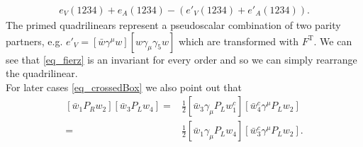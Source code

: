\begin{align}
 e_V(1234)+e_A(1234)-\left(e'_V(1234) + e'_A(1234)\right).
 \label{eq_fierz}
\end{align}
The primed quadrilinears represent a pseudoscalar combination of two parity partners, e.g. $e'_V = \left[\bar w\gamma^\mu w\right]\left[w\gamma_\mu\gamma_5w\right]$
which are transformed with $F^\text{T}$. We can see that \eqref{eq_fierz} is an invariant for every order and so we can simply rearrange the quadrilinear.
\\ \noindent For later cases \eqref{eq_crossedBox} we also point out that 
\begin{subequations}
\begin{align}
 \left[\bar w_1 P_R w_2\right]\left[\bar w_3 P_L w_4\right] =& \frac12  \left[\bar w_3 \gamma_\mu P_L w^c_1\right]\left[\bar w^c_4 \gamma^\mu P_L w_2\right]\\
 =& \frac12  \left[\bar w_1 \gamma_\mu P_L w_4\right]\left[\bar w^c_3 \gamma^\mu P_L w_2\right].
 \label{eq_fierzSPtoVA}
\end{align} 
\end{subequations}

